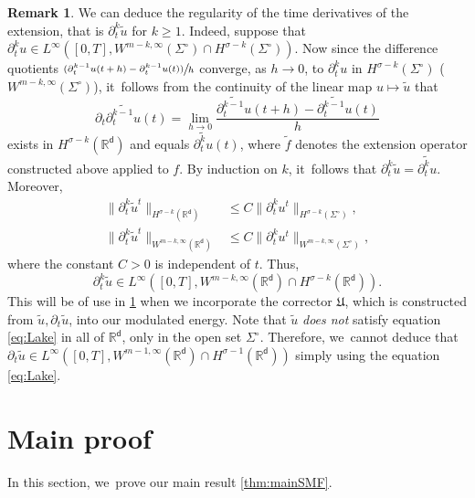\documentclass[JEP,XML,SOM,Unicode,published]{cedram}
\newcommand{\psfrac}[2]{\sfrac{(#1)}{#2}}
\newcommand{\Sigmacirc}{\Sigma^\circ}
\theoremstyle{plain}
\theoremstyle{definition}
\newtheorem{remark}[thm]{Remark}
\newcommand{\R}{{\mathbb{R}}}
\let\p\partial
\let\tl\tilde
\newcommand{\Uu}{\mathfrak{U}}
\renewcommand{\d}{\mathsf{d}}
\begin{document}
\skpt
\begin{remark}\label{rem:ptuext}
We can deduce the regularity of the time derivatives of the extension, that is $\p_t^k\tl u$ for $k\ge 1$. Indeed, suppose that $\p_t^k u \in L^\infty([0,T], W^{m-k,\infty}(\Sigmacirc)\cap H^{\sigma -k}(\Sigmacirc))$.
Now since the difference quotients $\psfrac{\p_t^{k-1}u(t+h) - \p_t^{k-1}u(t)}{h}$ converge, as $h\to 0$, to $\p_t^k u$ in $H^{\sigma-k}(\Sigmacirc)$ (\resp $W^{m-k,\infty}(\Sigmacirc)$), it~follows from the continuity of the linear map $u\mapsto \tl u$ that\vspace*{-5pt}
\begin{equation*}
\p_t\widetilde{\p_t^{k-1} u}(t)= \lim_{h\to 0} \frac{\widetilde{\p_t^{k-1} u}(t+h) - \widetilde{\p_t^{k-1} u}(t)}{h}\end{equation*}
exists in $H^{\sigma-k}(\R^\d)$ and equals $\widetilde{\p_t^k u}(t)$,
where $\widetilde{f}$ denotes the extension operator constructed above applied to $f$. By induction on $k$, it~follows that $\p_t^k\tl{u} = \widetilde{\p_t^k u}$. Moreover,\vspace*{-3pt}
\begin{align*}
\|\p_t^k\tl u^t\|_{H^{\sigma-k}(\R^\d)} &\leq C\|\p_t^k u^t\|_{H^{\sigma-k}(\Sigmacirc)},\\
\|\p_t^k \tl{u}^t\|_{W^{m-k,\infty}(\R^\d)} &\le C\|\p_t^k u^t\|_{W^{m-k,\infty}(\Sigmacirc)},
\end{align*}
where the constant $C>0$ is independent of $t$. Thus,\vspace*{-3pt}
\begin{equation}
\p_t^k\tl u\in L^\infty([0,T], W^{m-k,\infty}(\R^\d)\cap H^{\sigma-k}(\R^\d)).
\end{equation}
This will be of use in \cref{sec:MP} when we incorporate the corrector $\Uu$, which is constructed from $\tl u, \p_t\tl u$, into our modulated energy. Note that $\tl u$ \emph{does not} satisfy equation \eqref{eq:Lake} in all of $\R^\d$, only in the open set $\Sigmacirc$. Therefore, we~cannot deduce that $\p_t\tl u\in L^\infty([0,T], W^{m-1,\infty}(\R^\d) \cap H^{\sigma-1}(\R^\d))$ simply using the equation \eqref{eq:Lake}.
\end{remark}

\section{Main proof}\label{sec:MP}

In this section, we~prove our main result \cref{thm:mainSMF}.
\end{document}

